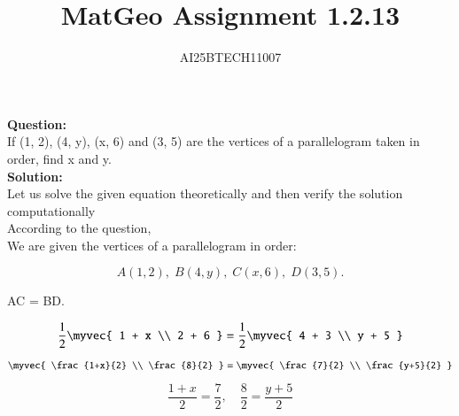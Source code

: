 \documentclass[journal]{IEEEtran}
\begin{document}

\vspace{3cm}

\title{MatGeo Assignment 1.2.13}
\author{AI25BTECH11007}
 \maketitle
{\let\newpage\relax\maketitle}

\renewcommand{\thefigure}{\theenumi}
\renewcommand{\thetable}{\theenumi}
\setlength{\intextsep}{10pt} %


\renewcommand{\thetable}{\theenumi}
\noindent
\textbf{Question:}\\
If (1, 2), (4, y), (x, 6) and (3, 5) are the vertices of a parallelogram taken in order, find
x and y.\\
\noindent
\textbf{Solution:}\\
Let us solve the given equation theoretically and then verify the solution computationally \\
According to the question, \\

We are given the vertices of a parallelogram in order:

$$A(1,2), \; B(4,y), \; C(x,6), \; D(3,5).$$


 AC =  BD.

\begin{equation}
\frac{1}{2}
\myvec{
1 + x \\
2 + 6
}
=
\frac{1}{2}
\myvec{
4 + 3 \\
y + 5
}
\end{equation}

\begin{equation}
\myvec{
\frac{1+x}{2} \\
\frac{8}{2}
}
=
\myvec{
\frac{7}{2} \\
\frac{y+5}{2}
}
\end{equation}

\begin{equation}
\frac{1+x}{2} = \frac{7}{2}, 
\quad 
\frac{8}{2} = \frac{y+5}{2}
\end{equation}
\end{document}

